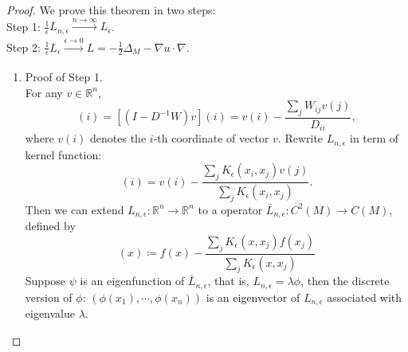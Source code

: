 \documentclass[11pt]{article}
\newcommand\<{\langle}
\newcommand\RR{\mathbb{R}}
\renewcommand\>{\rangle}
\begin{document}
\begin{proof}
We prove this theorem in two steps:\\
Step 1: $\frac{1}{\epsilon}L_{n,\epsilon}\xrightarrow[]{\text{$n\rightarrow\infty$}}  L_\epsilon$.\\
Step 2: $\frac{1}{\epsilon}L_\epsilon\xrightarrow[]{\text{$\epsilon\rightarrow 0$}}L=-\frac{1}{2}\Delta_M-\nabla u\cdot \nabla$. 
\begin{enumerate}
\item Proof of Step 1.\\
For any $v\in\RR^n$, 
\begin{equation*}
[L_{n,\epsilon}(v)](i)=[(I-D^{-1}W)v](i)=v(i)-\frac{\sum_{j}W_{ij}v(j)}{D_{ii}},
\end{equation*}
where $v(i)$ denotes the $i$-th coordinate of vector $v$. Rewrite $L_{n,\epsilon}$ in term of kernel function:
\begin{equation}
[L_{n,\epsilon}(v)](i)=v(i)-\frac{\sum_{j}K_{\epsilon}(x_i,x_j)v(j)}{\sum_j K_\epsilon(x_i,x_j)}.
\end{equation}
Then we can extend $L_{n,\epsilon}:\RR^n\rightarrow \RR^n$ to a operator 
$\bar L_{n,\epsilon}:C^2(M)\rightarrow C(M)$, defined by
\begin{equation}
[\bar L_{n,\epsilon}(f)](x)\coloneqq f(x)-\frac{\sum_{j}K_{\epsilon}(x,x_j)f(x_j)}{\sum_j K_\epsilon(x,x_j)}
\end{equation}
Suppose $\psi$ is an eigenfunction of $\bar L_{n,\epsilon}$, that is, $L_{n,\epsilon}=\lambda\phi$, then the discrete version of $\phi$: $(\phi(x_1),\cdots,\phi(x_n))$ is an eigenvector of $L_{n,\epsilon}$ associated with eigenvalue $\lambda$. 


\end{enumerate}
\end{proof}
\end{document}
